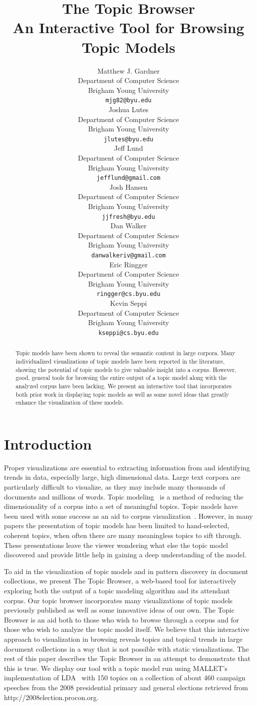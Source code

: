 \documentclass{article}
\title{The Topic Browser\\An Interactive Tool for Browsing Topic Models}
\author{
Matthew J. Gardner \\
Department of Computer Science \\
Brigham Young University \\
\texttt{mjg82@byu.edu} \\
\And
Joshua Lutes \\
Department of Computer Science \\
Brigham Young University \\
\texttt{jlutes@byu.edu} \\
\And
Jeff Lund \\
Department of Computer Science \\
Brigham Young University \\
\texttt{jefflund@gmail.com} \\
\And
Josh Hansen \\
Department of Computer Science \\
Brigham Young University \\
\texttt{jjfresh@byu.edu} \\
\And
Dan Walker \\
Department of Computer Science \\
Brigham Young University \\
\texttt{danwalkeriv@gmail.com} \\
\And
Eric Ringger \\
Department of Computer Science \\
Brigham Young University \\
\texttt{ringger@cs.byu.edu} \\
\And
Kevin Seppi \\
Department of Computer Science \\
Brigham Young University \\
\texttt{kseppi@cs.byu.edu} \\
}
\begin{document}
\nipsfinalcopy %
\maketitle

\begin{abstract}

Topic models have been shown to reveal the semantic content in large corpora.
Many individualized visualizations of topic models have been reported in the
literature, showing the potential of topic models to give valuable insight into
a corpus.  However, good, general tools for browsing the entire output of a
topic model along with the analyzed corpus have been lacking.  We present an
interactive tool that incorporates both prior work in displaying topic models
as well as some novel ideas that greatly enhance the visualization of these
models.

\end{abstract}

\section{Introduction}

Proper visualizations are essential to extracting information from and
identifying trends in data, especially large, high dimensional data.  Large
text corpora are particularly difficult to visualize, as they may include many
thousands of documents and millions of words.  Topic
modeling~\cite{blei-2003-latent-dirichlet-allocation} is a method of reducing
the dimensionality of a corpus into a set of meaningful topics.  Topic models
have been used with some success as an aid to corpus
visualization~\cite{blei-2009-topic-models,
newman-2010-visualizing-with-topic-maps}.  However, in many papers the
presentation of topic models has been limited to hand-selected, coherent
topics, when often there are many meaningless topics to sift through.  These
presentations leave the viewer wondering what else the topic model discovered
and provide little help in gaining a deep understanding of the model.

To aid in the visualization of topic models and in pattern discovery in
document collections, we present The Topic Browser, a web-based tool for
interactively exploring both the output of a topic modeling algorithm and its
attendant corpus.  Our topic browser incorporates many visualizations of topic
models previously published as well as some innovative ideas of our own.  The
Topic Browser is an aid both to those who wish to browse through a corpus and
for those who wish to analyze the topic model itself.  We believe that this
interactive approach to visualization in browsing reveals topics and topical
trends in large document collections in a way that is not possible with static
visualizations.  The rest of this paper describes the Topic Browser in an
attempt to demonstrate that this is true.  We display our tool with a topic
model run using MALLET's implementation of LDA~\cite{mallet} with 150 topics on
a collection of about 460 campaign speeches from the 2008 presidential primary
and general elections retrieved from http://2008election.procon.org.
\end{document}
